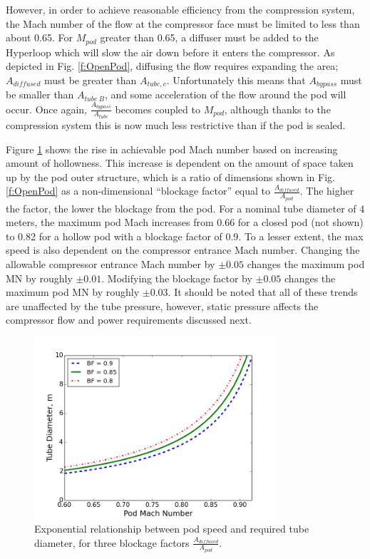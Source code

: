 \documentclass[heading.tex]{subfiles}
\begin{document}
However, in order to achieve reasonable efficiency from the compression system, the Mach number of the flow at the compressor face
must be limited to less than about 0.65. For $M_{pod}$ greater than 0.65, a diffuser must be added to the Hyperloop 
which will slow the air down before it enters the compressor. As depicted in Fig. \ref{f:OpenPod}, diffusing the flow 
requires expanding the area; $A_{diffused}$ must be greater than $A_{tube,c}$. Unfortunately this means that
$A_{bypass}$ must be smaller than $A_{tube\ B}$, and some acceleration of the flow around the pod will occur.
Once again, $\frac{A_{bypass}}{A_{tube}}$ becomes coupled to $M_{pod}$, although thanks to the compression 
system this is now much less restrictive than if the pod is sealed. 

Figure \ref{f:machRAD} shows the rise in achievable pod Mach number based on increasing amount of hollowness.
This increase is dependent on the amount of space taken up by the pod outer structure,
which is a ratio of dimensions shown in Fig. \ref{f:OpenPod}
as a non-dimensional ``blockage factor'' equal to $\frac{A_{diffused}}{A_{pod}}$.
The higher the factor, the lower the blockage from the pod.
For a nominal tube diameter of 4 meters, the maximum pod Mach increases from 0.66 for a closed pod (not shown)
to 0.82 for a hollow pod with a blockage factor of 0.9.
To a lesser extent, the max speed is also dependent on the compressor entrance Mach number.
Changing the allowable compressor entrance Mach number by $\pm 0.05$ changes the maximum pod MN by roughly $\pm 0.01$. 
Modifying the blockage factor by $\pm 0.05$ changes the maximum pod MN by roughly $\pm 0.03$.
It should be noted that all of these trends are unaffected by the tube pressure,
however, static pressure affects the compressor flow and power requirements discussed next.


\begin{figure}[H]
\centering
\includegraphics[width=0.8\textwidth]{images/mach_vs_rad6.png}
\caption[Tube and Pod Radius vs Mach]{Exponential relationship between pod speed and required tube diameter, for three blockage factors $\frac{A_{diffused}}{A_{pod}}$.}
\label{f:machRAD}
\end{figure}
\end{document}
